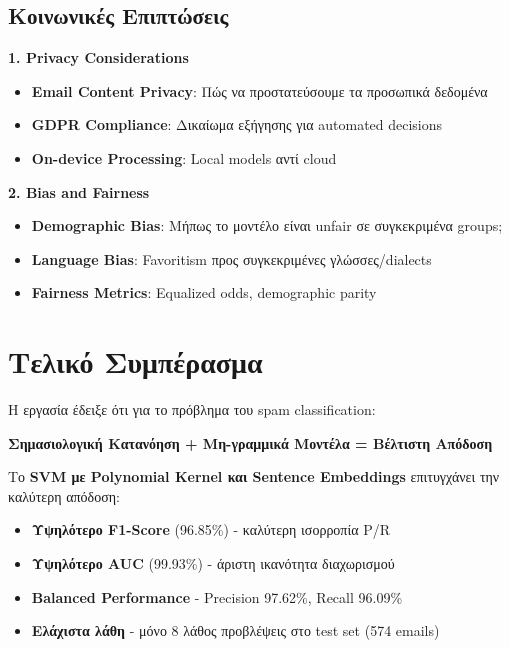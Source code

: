 \documentclass[12pt,a4paper,twoside]{book}
\begin{document}
\subsection{Κοινωνικές Επιπτώσεις}

\textbf{1. Privacy Considerations}

\begin{itemize}
    \item \textbf{Email Content Privacy}: Πώς να προστατεύσουμε τα προσωπικά δεδομένα
    \item \textbf{GDPR Compliance}: Δικαίωμα εξήγησης για automated decisions
    \item \textbf{On-device Processing}: Local models αντί cloud
\end{itemize}

\textbf{2. Bias and Fairness}

\begin{itemize}
    \item \textbf{Demographic Bias}: Μήπως το μοντέλο είναι unfair σε συγκεκριμένα groups;
    \item \textbf{Language Bias}: Favoritism προς συγκεκριμένες γλώσσες/dialects
    \item \textbf{Fairness Metrics}: Equalized odds, demographic parity
\end{itemize}

\section{Τελικό Συμπέρασμα}

Η εργασία έδειξε ότι για το πρόβλημα του spam classification:

\begin{center}
    \textbf{\Large Σημασιολογική Κατανόηση + Μη-γραμμικά Μοντέλα = Βέλτιστη Απόδοση}
\end{center}

Το \textbf{SVM με Polynomial Kernel και Sentence Embeddings} επιτυγχάνει την καλύτερη απόδοση:
\begin{itemize}
    \item \checkmark \textbf{Υψηλότερο F1-Score} (96.85\%) - καλύτερη ισορροπία P/R
    \item \checkmark \textbf{Υψηλότερο AUC} (99.93\%) - άριστη ικανότητα διαχωρισμού
    \item \checkmark \textbf{Balanced Performance} - Precision 97.62\%, Recall 96.09\%
    \item \checkmark \textbf{Ελάχιστα λάθη} - μόνο 8 λάθος προβλέψεις στο test set (574 emails)
\end{itemize}
\end{document}
